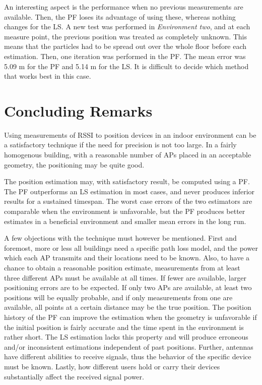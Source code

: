 \documentclass{LTHthesis}
\begin{document}
An interesting aspect is the performance when no previous measurements are available. Then, the PF loses its advantage of using these, whereas nothing changes for the LS. A new test was performed in \emph{Environment two}, and at each measure point, the previous position was treated as completely unknown. This means that the particles had to be spread out over the whole floor before each estimation. Then, one iteration was performed in the PF. The mean error was 5.09 m for the PF and 5.14 m for the LS. It is difficult to decide which method that works best in this case. 

%
\section{Concluding Remarks}
%
Using measurements of RSSI to position devices in an indoor environment can be a satisfactory technique if the need for precision is not too large. In a fairly homogenous building, with a reasonable number of APs placed in an acceptable geometry, the positioning may be quite good. 

The position estimation may, with satisfactory result, be computed using a PF. The PF outperforms an LS estimation in most cases, and never produces inferior results for a sustained timespan. The worst case errors of the two estimators are comparable when the environment is unfavorable, but the PF produces better estimates in a beneficial environment and smaller mean errors in the long run. 

A few objections with the technique must however be mentioned. First and foremost, more or less all buildings need a specific path loss model, and the power which each AP transmits and their locations need to be known. Also, to have a chance to obtain a reasonable position estimate, measurements from at least three different APs must be available at all times. If fewer are available, larger positioning errors are to be expected. If only two APs are available, at least two positions will be equally probable, and if only measurements from one are available, all points at a certain distance may be the true position. The position history of the PF can improve the estimation when the geometry is unfavorable if the initial position is fairly accurate and the time spent in the environment is rather short. The LS estimation lacks this property and will produce erroneous and/or inconsistent estimations independent of past positions. Further, antennas have different abilities to receive signals, thus the behavior of the specific device must be known. Lastly, how different users hold or carry their devices substantially affect the received signal power.  
\end{document}
